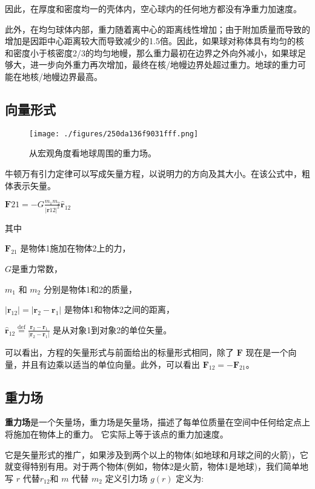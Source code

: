 因此，在厚度和密度均一的壳体内，空心球内的任何地方都没有净重力加速度。

此外，在均匀球体内部，重力随着离中心的距离线性增加；由于附加质量而导致的增加是因距中心距离较大而导致减少的1.5倍。因此，如果球对称体具有均匀的核和密度小于核密度2/3的均匀地幔，那么重力最初在边界之外向外减小，如果球足够大，进一步向外重力再次增加，最终在核/地幔边界处超过重力。地球的重力可能在地核/地幔边界最高。

\subsection{向量形式}

\begin{figure}[ht]
\centering
\texttt{[image: ./figures/250da136f9031fff.png]}
\caption{从宏观角度看地球周围的重力场。} \label{fig_UG_6}
\end{figure}

牛顿万有引力定律可以写成矢量方程，以说明力的方向及其大小。在该公式中，粗体表示矢量。

$\mathbf{F}{21} = -G \frac{m_1 m_2}{|\mathbf{r}{12}|^2} \hat{\mathbf{r}}_{12}$

其中

$\mathbf{F}_{21}$ 是物体1施加在物体2上的力，

$G$是重力常数，

$m_1$ 和 $m_2$ 分别是物体1和2的质量，

$|\mathbf{r}_{12}| = |\mathbf{r}_2 - \mathbf{r}_1|$ 是物体1和物体2之间的距离，

$\hat{\mathbf{r}}_{12} \stackrel{\text{def}}{=} \frac{\mathbf{r}_2 - \mathbf{r}_1}{|\mathbf{r}_2 - \mathbf{r}_1|}$ 是从对象1到对象2的单位矢量。


可以看出，方程的矢量形式与前面给出的标量形式相同，除了 $\mathbf{F}$ 现在是一个向量，并且有边乘以适当的单位向量。此外，可以看出 $\mathbf{F}_{12} = -\mathbf{F}_{21}$。

\subsection{重力场}

\textbf{重力场}是一个矢量场，重力场是矢量场，描述了每单位质量在空间中任何给定点上将施加在物体上的重力。 它实际上等于该点的重力加速度。

它是矢量形式的推广，如果涉及到两个以上的物体(如地球和月球之间的火箭)，它就变得特别有用。对于两个物体(例如，物体2是火箭，物体1是地球)，我们简单地写 $r$ 代替$r_{12}$和 $m$ 代替 $m_2$ 定义引力场 $g(r)$ 定义为:


